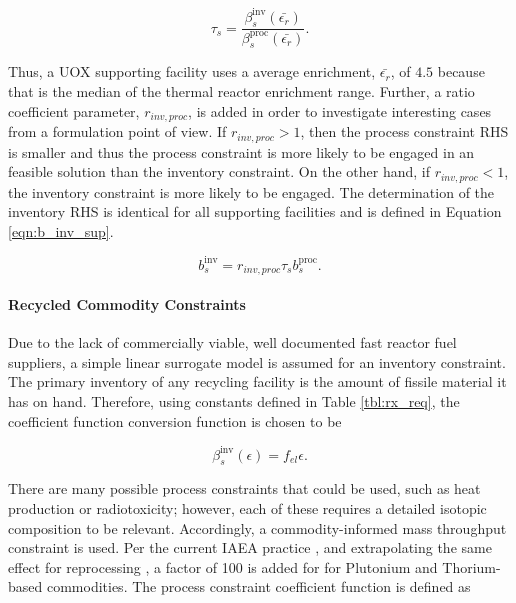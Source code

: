 \begin{equation}
\tau_s = \frac{\beta^{\text{inv}}_s(\bar{\epsilon_r})}{\beta^{\text{proc}}_s(\bar{\epsilon_r})}.
\end{equation}

\noindent
Thus, a UOX supporting facility uses a average enrichment, $\bar{\epsilon_r}$,
of $4.5$ because that is the median of the thermal reactor enrichment
range. Further, a ratio coefficient parameter, $r_{inv, proc}$, is added in
order to investigate interesting cases from a formulation point of view. If
$r_{inv, proc} > 1$, then the process constraint RHS is smaller and thus the
process constraint is more likely to be engaged in an feasible solution than the
inventory constraint. On the other hand, if $r_{inv, proc} < 1$, the inventory
constraint is more likely to be engaged. The determination of the inventory RHS
is identical for all supporting facilities and is defined in Equation
\ref{eqn:b_inv_sup}.

\begin{equation}\label{eqn:b_inv_sup}
b^{\text{inv}}_s = 
r_{inv, proc} \tau_s b^{\text{proc}}_s.
\end{equation}


\paragraph{Recycled Commodity Constraints}

Due to the lack of commercially viable, well documented fast reactor fuel
suppliers, a simple linear surrogate model is assumed for an inventory
constraint. The primary inventory of any recycling facility is the amount of
fissile material it has on hand. Therefore, using constants defined in Table
\ref{tbl:rx_req}, the coefficient function conversion function is chosen to be

\begin{equation}
\beta^{\text{inv}}_s(\epsilon) = f_{el} \epsilon. 
\end{equation}

There are many possible process constraints that could be used, such as heat
production or radiotoxicity; however, each of these requires a detailed isotopic
composition to be relevant. Accordingly, a commodity-informed mass throughput
constraint is used. Per the current IAEA practice \cite{heinonen2010}, and
extrapolating the same effect for reprocessing , a factor of 100 is
added for for Plutonium and Thorium-based commodities. The process constraint
coefficient function is defined as

